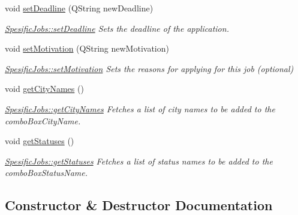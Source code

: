 \begin{DoxyCompactItemize}
void \mbox{\hyperlink{class_spesific_jobs_a80ceb9ead40dc83e0adcf6ed2b3d5465}{set\+Deadline}} (Q\+String new\+Deadline)
\begin{DoxyCompactList}\small\item\em \mbox{\hyperlink{class_spesific_jobs_a80ceb9ead40dc83e0adcf6ed2b3d5465}{Spesific\+Jobs\+::set\+Deadline}} Sets the deadline of the application. \end{DoxyCompactList}\item 
void \mbox{\hyperlink{class_spesific_jobs_a39df1f364b1ca8e3059094708f01983c}{set\+Motivation}} (Q\+String new\+Motivation)
\begin{DoxyCompactList}\small\item\em \mbox{\hyperlink{class_spesific_jobs_a39df1f364b1ca8e3059094708f01983c}{Spesific\+Jobs\+::set\+Motivation}} Sets the reasons for applying for this job (optional) \end{DoxyCompactList}\item 
\mbox{\label{class_spesific_jobs_acbf1efeeb4000a0a1238897daa74085b}} 
void \mbox{\hyperlink{class_spesific_jobs_acbf1efeeb4000a0a1238897daa74085b}{get\+City\+Names}} ()
\begin{DoxyCompactList}\small\item\em \mbox{\hyperlink{class_spesific_jobs_acbf1efeeb4000a0a1238897daa74085b}{Spesific\+Jobs\+::get\+City\+Names}} Fetches a list of city names to be added to the combo\+Box\+City\+Name. \end{DoxyCompactList}\item 
\mbox{\label{class_spesific_jobs_ad1eead4bdf63388b3cbe0bb79b4b0d09}} 
void \mbox{\hyperlink{class_spesific_jobs_ad1eead4bdf63388b3cbe0bb79b4b0d09}{get\+Statuses}} ()
\begin{DoxyCompactList}\small\item\em \mbox{\hyperlink{class_spesific_jobs_ad1eead4bdf63388b3cbe0bb79b4b0d09}{Spesific\+Jobs\+::get\+Statuses}} Fetches a list of status names to be added to the combo\+Box\+Status\+Name. \end{DoxyCompactList}\end{DoxyCompactItemize}


\subsection{Constructor \& Destructor Documentation}
\mbox{\label{class_spesific_jobs_a382c130bb70f2bf25c76ef5c720659d6}} 
